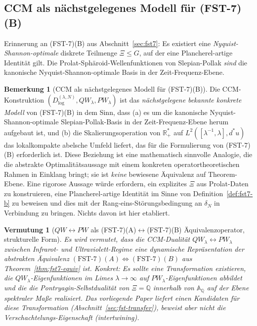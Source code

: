 \documentclass[11pt,a4paper]{article}
\theoremstyle{plain}
\newtheorem{conjecture}[theorem]{Vermutung}
\theoremstyle{definition}
\newtheorem{remark}[theorem]{Bemerkung}
\newcommand{\R}{\mathbb{R}}
\newcommand{\Q}{\mathbb{Q}}
\newcommand{\A}{\mathbb{A}}
\begin{document}
\subsection{CCM als nächstgelegenes Modell für (FST-7)(B)}
\label{sec:ccm-as-fst7b}

Erinnerung an (FST-7)(B) aus Abschnitt~\ref{sec:fst7}: Es existiert eine
\emph{Nyquist-Shannon-optimale} diskrete Teilmenge $\Xi \le G$, auf der
eine Plancherel-artige Identität gilt. Die Prolat-Sphäroid-Wellenfunktionen
von Slepian-Pollak \emph{sind} die kanonische Nyquist-Shannon-optimale
Basis in der Zeit-Frequenz-Ebene.

\begin{remark}[CCM als nächstgelegenes Modell für (FST-7)(B)]\label{rem:ccm-closest-model}
Die CCM-Konstruktion $(D^{(\lambda,N)}_{\log}, QW_\lambda, PW_\lambda)$
ist das \emph{nächstgelegene bekannte konkrete Modell} von (FST-7)(B) in dem Sinn,
dass (a) es um die kanonische Nyquist-Shannon-optimale Slepian-Pollak-Basis
in der Zeit-Frequenz-Ebene herum aufgebaut ist, und (b) die Skalierungsoperation
von $\R_+^\ast$ auf $L^2([\lambda^{-1},\lambda], d^\ast u)$ das lokalkompakte abelsche
Umfeld liefert, das für die Formulierung von (FST-7)(B) erforderlich ist. Diese
Beziehung ist eine mathematisch sinnvolle Analogie, die die abstrakte
Optimalitätsaussage mit einem konkreten operatortheoretischen Rahmen in Einklang
bringt; sie ist \emph{keine} bewiesene Äquivalenz auf Theorem-Ebene. Eine
rigorose Aussage würde erfordern, ein explizites $\Xi$ aus Prolat-Daten zu
konstruieren, eine Plancherel-artige Identität im Sinne von Definition~\ref{def:fst7-b}
zu beweisen und dies mit der Rang-eins-Störungsbedingung an $\delta_N$ in
Verbindung zu bringen. Nichts davon ist hier etabliert.
\end{remark}

\begin{conjecture}[$QW\!\leftrightarrow\! PW$ als (FST-7)(A)$\leftrightarrow$(FST-7)(B) Äquivalenzoperator, strukturelle Form]\label{conj:qw-pw-fst7}
Es wird vermutet, dass die CCM-Dualität $QW_\lambda \leftrightarrow PW_\lambda$
zwischen Infrarot- und Ultraviolett-Regime eine dynamische Repräsentation
der abstrakten Äquivalenz $(\text{FST-7})(A) \Leftrightarrow (\text{FST-7})(B)$
aus Theorem~\ref{thm:fst7-equiv} ist. Konkret: Es sollte eine Transformation
existieren, die $QW_\lambda$-Eigenfunktionen im Limes $\lambda \to \infty$ auf
$PW_\lambda$-Eigenfunktionen abbildet und die die Pontryagin-Selbstdualität
von $\Xi = \Q$ innerhalb von $\A_\Q$ auf der Ebene spektraler Maße realisiert.
Das vorliegende Paper liefert einen Kandidaten für diese Transformation
(Abschnitt~\ref{sec:fst-transfer}), beweist aber nicht die Verschachtelungs-Eigenschaft (intertwining).
\end{conjecture}
\end{document}
